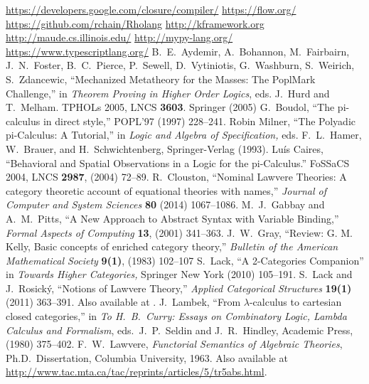 \documentclass[submission,copyright,creativecommons]{eptcs}
\begin{document}
\begin{thebibliography}{99}
 \href{https://developers.google.com/closure/compiler/}{https://developers.google.com/closure/compiler/}
 \href{https://flow.org/}{https://flow.org/}
 \href{https://github.com/rchain/Rholang}{https://github.com/rchain/Rholang}
 \href{http://kframework.org}{http://kframework.org}
 \href{http://maude.cs.illinois.edu/}{http://maude.cs.illinois.edu/}
 \href{http://mypy-lang.org/}{http://mypy-lang.org/}
 \href{https://www.typescriptlang.org/}{https://www.typescriptlang.org/}
 B.\ E.\ Aydemir, A.\ Bohannon, M.\ Fairbairn, J.\ N.\ Foster, B.\ C.\ Pierce, P.\ Sewell, D.\ Vytiniotis, G.\ Washburn, S.\ Weirich, S.\ Zdancewic, ``Mechanized Metatheory for the Masses: The PoplMark Challenge,'' in {\em Theorem Proving in Higher Order Logics}, eds. J.\ Hurd and T.\ Melham. TPHOLs 2005, LNCS {\bf 3603}. Springer (2005)
 G.\ Boudol, ``The pi-calculus in direct style,'' POPL'97 (1997) 228--241.
 Robin Milner, ``The Polyadic {pi-Calculus}: A Tutorial,'' in {\em Logic and Algebra of Specification,} eds. F.\ L.\ Hamer, W.\ Brauer, and H.\ Schwichtenberg, Springer-Verlag (1993).
 Lu\'is Caires, ``Behavioral and Spatial Observations in a Logic for the pi-Calculus.''  FoSSaCS 2004, LNCS {\bf 2987}, (2004) 72--89.
 R.\ Clouston, ``Nominal Lawvere Theories: A category theoretic account of equational theories with names,'' {\em Journal of Computer and System Sciences} {\bf 80} (2014) 1067--1086.
 M.\ J.\ Gabbay and A.\ M.\ Pitts, ``A New Approach to Abstract Syntax with Variable Binding,'' {\em Formal Aspects of Computing} {\bf 13}, (2001) 341--363.
 J.\ W.\ Gray, ``Review: G. M. Kelly, Basic concepts of enriched category theory,'' {\em Bulletin of the American Mathematical Society} {\bf 9(1)}, (1983) 102--107 
 S.\ Lack, ``A 2-Categories Companion'' in {\em Towards Higher Categories,} Springer New York (2010) 105--191.
 S.\ Lack and J.\ Rosick{\'{y}}, ``Notions of Lawvere Theory,'' {\em Applied Categorical Structures} {\bf 19(1)} (2011) 363--391.  Also available at .
 J.\ Lambek, ``From $\lambda$-calculus to cartesian closed categories,'' in {\sl To H.\ B.\ Curry: Essays on Combinatory Logic, Lambda Calculus and Formalism}, eds.\ J.\ P.\ Seldin and J.\ R.\ Hindley, Academic Press, (1980) 375--402. 
 F.\ W.\ Lawvere, {\sl Functorial Semantics of Algebraic Theories}, Ph.D.\ Dissertation, Columbia University, 1963. Also available at \href{http://www.tac.mta.ca/tac/reprints/articles/5/tr5abs.html}{http://www.tac.mta.ca/tac/reprints/articles/5/tr5abs.html}.

\end{thebibliography}
\end{document}
